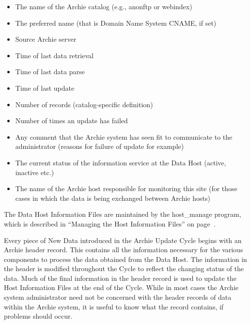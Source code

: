 \begin{itemize}
\item The name of the Archie catalog (e.g., anonftp or webindex)

\item The preferred name (that is Domain Name System CNAME, if set)

\item Source Archie server

\item Time of last data retrieval

\item Time of last data parse

\item Time of last update

\item Number of records (catalog-specific definition)

\item Number of times an update has failed

\item  Any comment that the Archie system has seen fit to communicate to the
administrator (reasons for failure of update for example)

\item The current status of the information service at the Data Host (active,
inactive etc.)

\item The name of the Archie host responsible for monitoring this site (for
those cases in which the data is being exchanged between Archie hosts)
\end{itemize}

The Data Host Information Files are maintained by the host\_manage program,
which is described in ``Managing the Host Information Files'' on
page~\pageref{chap:hostmanage}.

Every piece of New Data introduced in the Archie Update Cycle begins with an
Archie header record. This contains all the information necessary for the
various components to process the data obtained from the Data Host. The
information in the header is modified throughout the Cycle to reflect the
changing status of the data. Much of the final information in the header
record is used to update the Host Information Files at the end of the
Cycle. While in most cases the Archie system administrator need not be
concerned with the header records of data within the Archie system, it is
useful to know what the record contains, if problems should occur.

